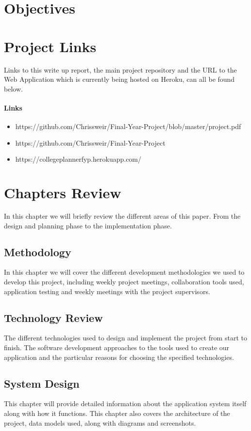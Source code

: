 \section{Objectives}

\section{Project Links}
Links to this write up report, the main project repository and the URL to the Web Application which is currently being hosted on Heroku, can all be found below.

\paragraph{Links}
\begin{itemize}
\item https://github.com/Chrissweir/Final-Year-Project/blob/master/project.pdf
\item https://github.com/Chrissweir/Final-Year-Project
\item https://collegeplannerfyp.herokuapp.com/
\end{itemize}

\section{Chapters Review}
In this chapter we will briefly review the different areas of this paper. From the design and planning phase to the implementation phase.

\subsection{Methodology}
In this chapter we will cover the different development methodologies we used to develop this project, including weekly project meetings, collaboration tools used, application testing and weekly meetings with the project supervisors.

\subsection{Technology Review}
The different technologies used to design and implement the project from start to finish. The software development approaches to the tools used to create our application and the particular reasons for choosing the specified technologies.

\subsection{System Design}
This chapter will provide detailed information about the application system itself along with how it functions. This chapter also covers the architecture of the project, data models used, along with diagrams and screenshots.

